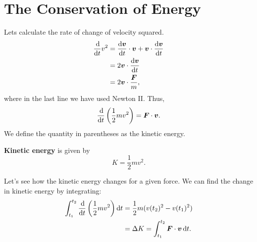 \documentclass[../classical_mechanics.tex]{subfiles}
\begin{document}
    \section{The Conservation of Energy}\label{sec:conservation-of-energy}
        Lets calculate the rate of change of velocity squared.
        \begin{align}
            \dv{}{t}v^2&=\dv{\vec{v}}{t}\cdot\vec{v}+\vec{v}\cdot\dv{\vec{v}}{t}\\
            &=2\vec{v}\cdot\dv{\vec{v}}{t}\\
            &=2\vec{v}\cdot\frac{\vec{F}}{m},
        \end{align}
        where in the last line we have used Newton II. Thus,
        \begin{equation}
            \dv{}{t}\left(\frac{1}{2}mv^2\right)=\vec{F}\cdot\vec{v}.
        \end{equation}
        We define the quantity in parentheses as the kinetic energy.
        \begin{definition}
            \textbf{Kinetic energy} is given by
            \begin{equation}
                K=\frac{1}{2}mv^2.
            \end{equation}
        \end{definition}
        Let's see how the kinetic energy changes for a given force. We can find the change in kinetic energy by integrating:
        \begin{align}
            \int_{t_1}^{t_2}\dv{}{t}\left(\frac{1}{2}mv^2\right)\dd{t}&=\frac{1}{2}m(v(t_2)^2-v(t_1)^2)\\
            &=\Delta K=\int_{t_1}^{t_2}\vec{F}\cdot\vec{v}\dd{t}.
        \end{align}
\end{document}
